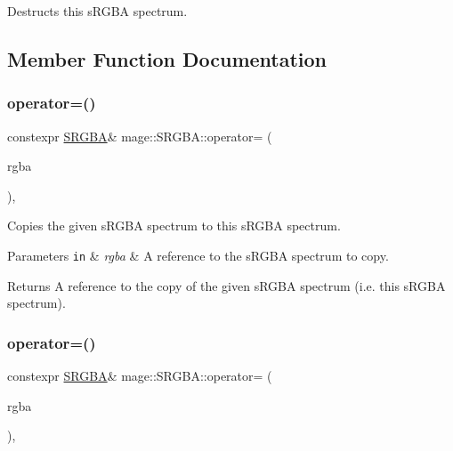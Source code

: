 Destructs this s\+R\+G\+BA spectrum. 

\subsection{Member Function Documentation}
\hypertarget{structmage_1_1_s_r_g_b_a_affa097b1744a66624f40102870909ea9}{}\label{structmage_1_1_s_r_g_b_a_affa097b1744a66624f40102870909ea9} 
\subsubsection{\texorpdfstring{operator=()}{operator=()}\hspace{0.1cm}{\footnotesize\ttfamily [1/2]}}
{\footnotesize\ttfamily constexpr \hyperlink{structmage_1_1_s_r_g_b_a}{S\+R\+G\+BA}\& mage\+::\+S\+R\+G\+B\+A\+::operator= (\begin{DoxyParamCaption}\item[{const \hyperlink{structmage_1_1_s_r_g_b_a}{S\+R\+G\+BA} \&}]{rgba }\end{DoxyParamCaption})\hspace{0.3cm}{\ttfamily [default]}, {\ttfamily [noexcept]}}

Copies the given s\+R\+G\+BA spectrum to this s\+R\+G\+BA spectrum.


\begin{DoxyParams}[1]{Parameters}
\mbox{\tt in}  & {\em rgba} & A reference to the s\+R\+G\+BA spectrum to copy. \\
\hline
\end{DoxyParams}
\begin{DoxyReturn}{Returns}
A reference to the copy of the given s\+R\+G\+BA spectrum (i.\+e. this s\+R\+G\+BA spectrum). 
\end{DoxyReturn}
\hypertarget{structmage_1_1_s_r_g_b_a_abf4cd2acd424cbad774a5170087f7b01}{}\label{structmage_1_1_s_r_g_b_a_abf4cd2acd424cbad774a5170087f7b01} 
\subsubsection{\texorpdfstring{operator=()}{operator=()}\hspace{0.1cm}{\footnotesize\ttfamily [2/2]}}
{\footnotesize\ttfamily constexpr \hyperlink{structmage_1_1_s_r_g_b_a}{S\+R\+G\+BA}\& mage\+::\+S\+R\+G\+B\+A\+::operator= (\begin{DoxyParamCaption}\item[{\hyperlink{structmage_1_1_s_r_g_b_a}{S\+R\+G\+BA} \&\&}]{rgba }\end{DoxyParamCaption})\hspace{0.3cm}{\ttfamily [default]}, {\ttfamily [noexcept]}}

